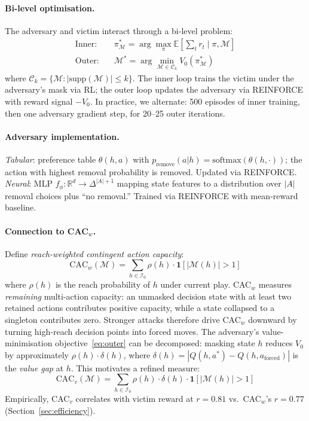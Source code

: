 \documentclass{article}
\begin{document}
\paragraph{Bi-level optimisation.}
The adversary and victim interact through a bi-level problem:
\begin{align}
\text{Inner:} \quad & \pi^*_\mathcal{M} = \arg\max_\pi \mathbb{E}\left[\sum_t r_t \mid \pi, \mathcal{M}\right] \label{eq:inner} \\
\text{Outer:} \quad & \mathcal{M}^* = \arg\min_{\mathcal{M} \in \mathcal{C}_k} V_0(\pi^*_\mathcal{M}) \label{eq:outer}
\end{align}
where $\mathcal{C}_k = \{\mathcal{M} : |\text{supp}(\mathcal{M})| \leq k\}$. The inner loop trains the victim under the adversary's mask via RL; the outer loop updates the adversary via REINFORCE with reward signal $-V_0$. In practice, we alternate: 500 episodes of inner training, then one adversary gradient step, for 20--25 outer iterations.

\paragraph{Adversary implementation.}
\emph{Tabular}: preference table $\theta(h, a)$ with $p_{\text{remove}}(a|h) = \text{softmax}(\theta(h,\cdot))$; the action with highest removal probability is removed. Updated via REINFORCE.
\emph{Neural}: MLP $f_\phi: \mathbb{R}^d \to \Delta^{|A|+1}$ mapping state features to a distribution over $|A|$ removal choices plus ``no removal.'' Trained via REINFORCE with mean-reward baseline.

\paragraph{Connection to CAC$_w$.}
Define \emph{reach-weighted contingent action capacity}:
\[
\text{CAC}_w(\mathcal{M}) = \sum_{h \in \mathcal{I}_0} \rho(h) \cdot \mathbf{1}[|\mathcal{M}(h)| > 1]
\]
where $\rho(h)$ is the reach probability of $h$ under current play. CAC$_w$ measures \emph{remaining} multi-action capacity: an unmasked decision state with at least two retained actions contributes positive capacity, while a state collapsed to a singleton contributes zero. Stronger attacks therefore drive CAC$_w$ downward by turning high-reach decision points into forced moves. The adversary's value-minimisation objective~\eqref{eq:outer} can be decomposed: masking state $h$ reduces $V_0$ by approximately $\rho(h) \cdot \delta(h)$, where $\delta(h) = |Q(h, a^*) - Q(h, a_{\text{forced}})|$ is the \emph{value gap} at $h$. This motivates a refined measure:
\[
\text{CAC}_v(\mathcal{M}) = \sum_{h \in \mathcal{I}_0} \rho(h) \cdot \delta(h) \cdot \mathbf{1}[|\mathcal{M}(h)| > 1]
\]
Empirically, CAC$_v$ correlates with victim reward at $r = 0.81$ vs.\ CAC$_w$'s $r = 0.77$ (Section~\ref{sec:efficiency}).
\end{document}
